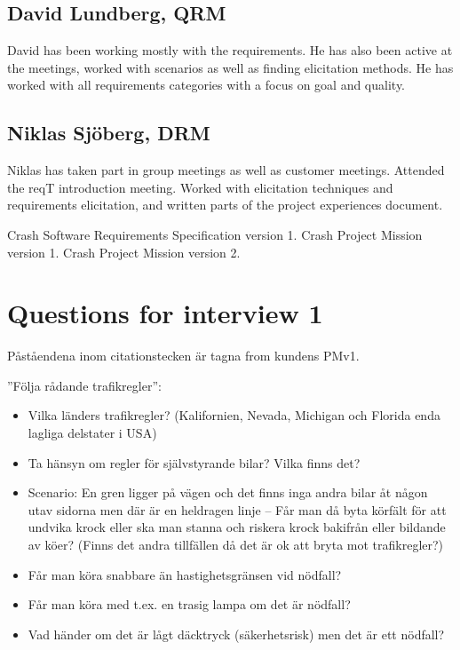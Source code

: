 \documentclass[10pt]{article}
\begin{document}
\subsection{David Lundberg, QRM}
David has been working mostly with the requirements. He has also been active at the meetings, worked with scenarios as well as finding elicitation methods. He has worked with all requirements categories with a focus on goal and quality. 
\subsection{Niklas Sjöberg, DRM}
Niklas has taken part in group meetings as well as customer meetings. Attended the reqT introduction meeting. Worked with elicitation techniques and requirements elicitation, and written parts of the project experiences document. 

\newpage
\begin{thebibliography}{1}
 Crash Software Requirements Specification version 1. 
 Crash Project Mission version 1.
 Crash Project Mission version 2.
\end{thebibliography}
\newpage

\appendix
\section{Questions for interview 1}
Påståendena inom citationstecken är tagna from kundens PMv1.

\noindent”Följa rådande trafikregler”:
\begin{itemize}
\item Vilka länders trafikregler? (Kalifornien, Nevada, Michigan och Florida enda lagliga delstater i USA)
\item Ta hänsyn om regler för självstyrande bilar? Vilka finns det?
\item Scenario: En gren ligger på vägen och det finns inga andra bilar åt någon utav sidorna men där är en heldragen linje – Får man då byta körfält för att undvika krock eller ska man stanna och riskera krock bakifrån eller bildande av köer? (Finns det andra tillfällen då det är ok att bryta mot trafikregler?)
\item Får man köra snabbare än hastighetsgränsen vid nödfall?
\item Får man köra med t.ex. en trasig lampa om det är nödfall?
\item Vad händer om det är lågt däcktryck (säkerhetsrisk) men det är ett nödfall?
\end{itemize}
\hfill \break
\end{document}
